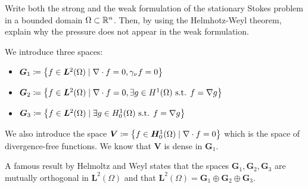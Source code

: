 \newpage
\begin{exercise}
    Write both the strong and the weak formulation of the stationary Stokes problem in a bounded domain \(\Omega \subset \mathbb{R}^n\). Then, by using the Helmhotz-Weyl theorem, explain why the pressure does not appear in the weak formulation.
\end{exercise}
\begin{remark}
    We introduce three spaces:
    \begin{itemize}
        \item \(\bm{G}_1 \coloneqq \left\{ f \in \bm{L}^2(\Omega) \mid \nabla \cdot f = 0, \gamma_\nu f = 0 \right\}\)
        \item \(\bm{G}_2 \coloneqq \left\{ f \in \bm{L}^2(\Omega) \mid \nabla \cdot f = 0, \exists g \in H^1(\Omega) \text{ s.t. } f = \nabla g \right\}\)
        \item \(\bm{G}_3 \coloneqq \left\{ f \in \bm{L}^2(\Omega) \mid \exists g \in H^1_0(\Omega) \text{ s.t. } f = \nabla g \right\}\)
    \end{itemize}
    We also introduce the space \(\bm{V} \coloneqq \left\{ f \in \bm{H}^1_0(\Omega) \mid \nabla \cdot f = 0 \right\}\) which is the space of divergence-free functions.
    We know that \(\bm{V}\) is dense in \(\bm{G}_1\).

    A famous result by Helmoltz and Weyl states that the spaces \(\bm{G}_1, \bm{G}_2, \bm{G}_3\) are mutually orthogonal in \(\bm{L}^2(\Omega)\) and that \(\bm{L}^2(\Omega) = \bm{G}_1 \oplus \bm{G}_2 \oplus \bm{G}_3\).
\end{remark}

